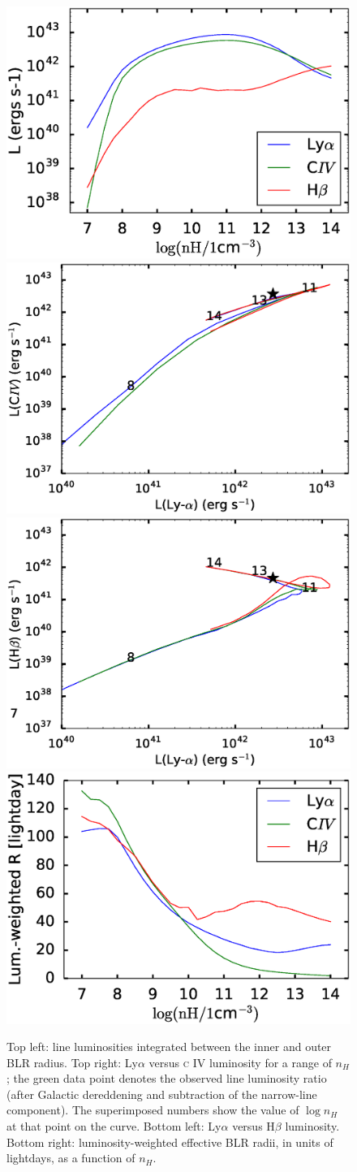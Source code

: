 \documentclass[paper=a4, fontsize=11pt]{scrartcl} %
\numberwithin{equation}{section} %
\numberwithin{figure}{section} %
\numberwithin{table}{section} %
\begin{document}
 

\begin{figure}
	\centering
	\includegraphics[width=0.49\linewidth]{L_nH}
	\includegraphics[width=0.49\linewidth]{lineL_civ_rin1}
	\includegraphics[width=0.49\linewidth]{lineL_hbeta_rin1}
	\includegraphics[width=0.49\linewidth]{RL_nH}
	\caption{Top left: line luminosities integrated between the inner and outer BLR radius. Top right: Ly$\alpha$ versus \textsc{c IV} luminosity for a range of $n_H$; the green data point denotes the observed line luminosity ratio (after Galactic dereddening and subtraction of the narrow-line component). The superimposed numbers show the value of $\log n_H$ at that point on the curve. Bottom left: Ly$\alpha$ versus H$\beta$ luminosity. Bottom right: luminosity-weighted effective BLR radii, in units of lightdays, as a function of $n_H$.}
	\label{fig:lnh}
\end{figure}
\end{document}
